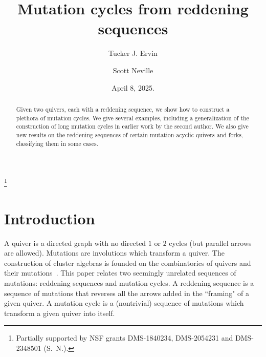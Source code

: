 \documentclass[11pt, letterpaper]{amsart}
\theoremstyle{definition}
\numberwithin{equation}{section}
\begin{document}
\title{Mutation cycles from reddening sequences}

\author[T. J. Ervin]{Tucker J. Ervin}
\address{Department of Mathematics, University of Alabama,
	Tuscaloosa, AL 35487, U.S.A.}

\author{Scott Neville}
\address{Department of Mathematics, University of Michigan, Ann Arbor, MI 48109, USA}


\date{April 8, 2025.}

\thanks{Partially supported by NSF grants DMS-1840234, DMS-2054231 
and DMS-2348501 (S.~N.).}




\begin{abstract}
Given two quivers, each with a reddening sequence, we show how to construct a plethora of mutation cycles.
We give several examples, including a generalization of the construction of long mutation cycles in earlier work by the second author.
We also give new results on the reddening sequences of certain mutation-acyclic quivers and forks, classifying them in some cases.
\end{abstract}
\maketitle

\section{Introduction}

A quiver is a directed graph with no directed $1$ or $2$ cycles (but parallel arrows are allowed).
Mutations are involutions which transform a quiver.
The construction of cluster algebras is founded on the combinatorics of quivers and their mutations~\cite{MR1887642}. 
This paper relates two seemingly unrelated sequences of mutations: reddening sequences and mutation cycles.
A reddening sequence is a sequence of mutations that reverses all the arrows added in the ``framing" of a given quiver.
A mutation cycle is a (nontrivial) sequence of mutations which transform a given quiver into itself.
\end{document}
